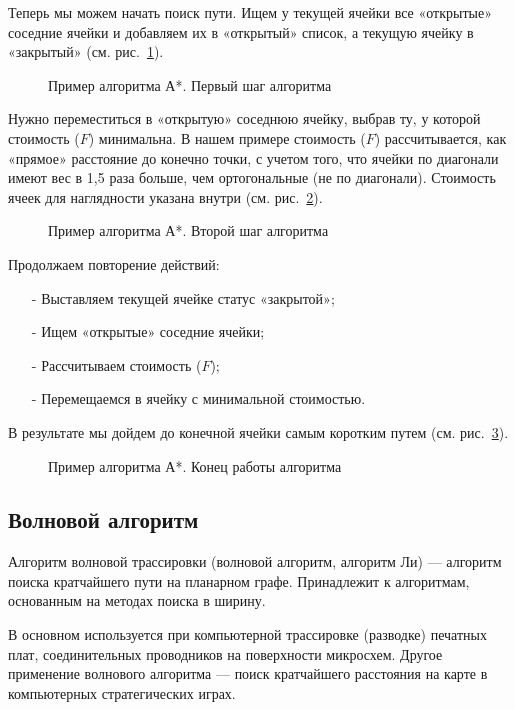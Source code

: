 Теперь мы можем начать поиск пути. 
Ищем у текущей ячейки все «открытые» соседние ячейки и добавляем их в «открытый» список, а текущую ячейку в «закрытый»  (см. рис.~\ref{ris:astar-2}).
\begin{figure}[ht]
\caption{Пример алгоритма А*. Первый шаг алгоритма}
\label{ris:astar-2}
\end{figure}

Нужно переместиться в «открытую» соседнюю ячейку, выбрав ту, у которой стоимость ($F$) минимальна.
В нашем примере стоимость ($F$) рассчитывается, как «прямое» расстояние до конечно точки, с учетом того, что ячейки по диагонали имеют вес в 1,5 раза больше, чем ортогональные (не по диагонали). 
Стоимость ячеек для наглядности указана внутри (см. рис.~\ref{ris:astar-3}).
\begin{figure}[ht]
\caption{Пример алгоритма А*. Второй шаг алгоритма}
\label{ris:astar-3}
\end{figure}

Продолжаем повторение действий:
\begin{itemize}
\item [-] Выставляем текущей ячейке статус «закрытой»;
\item [-] Ищем «открытые» соседние ячейки;
\item [-] Рассчитываем стоимость ($F$);
\item [-] Перемещаемся в ячейку с минимальной стоимостью.
\end{itemize}

В результате мы дойдем до конечной ячейки самым коротким путем (см. рис.~\ref{ris:astar-4}).\cite{astar-habr}
\begin{figure}[ht]
\caption{Пример алгоритма А*. Конец работы алгоритма}
\label{ris:astar-4}
\end{figure}


\subsection{Волновой алгоритм}

Алгоритм волновой трассировки (волновой алгоритм, алгоритм Ли) --- алгоритм поиска кратчайшего пути на планарном графе. 
Принадлежит к алгоритмам, основанным на методах поиска в ширину.

В основном используется при компьютерной трассировке (разводке) печатных плат, соединительных проводников на поверхности микросхем. 
Другое применение волнового алгоритма --- поиск кратчайшего расстояния на карте в компьютерных стратегических играх.

